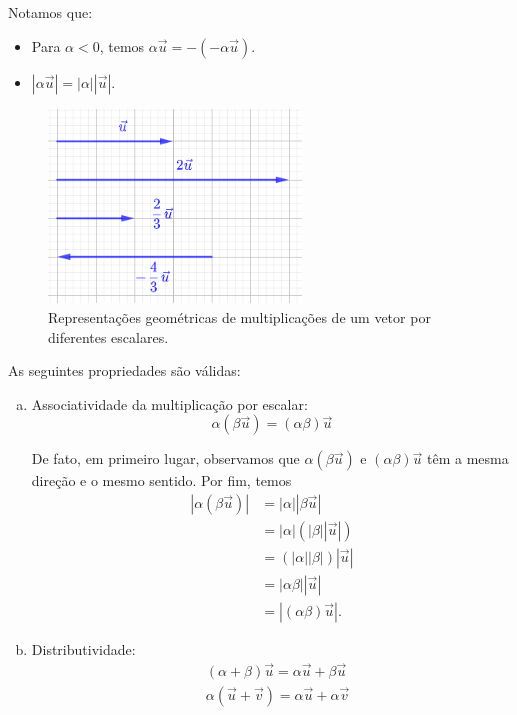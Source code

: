 \begin{obs}
  Notamos que:
  \begin{itemize}
  \item Para $\alpha<0$, temos $\alpha\vec{u} = -(-\alpha\vec{u})$.
  \item $|\alpha\vec{u}|=|\alpha||\vec{u}|$.
\end{itemize}
\end{obs}

\begin{figure}[H]
  \centering
  \includegraphics[width=0.6\textwidth]{./cap_vetor/dados/fig_vescalar/fig_vescalar}
  \caption{Representações geométricas de multiplicações de um vetor por diferentes escalares.}
  \label{fig:vescalar}
\end{figure}

\begin{obs}
  As seguintes propriedades são válidas:
  \begin{enumerate}[a)]
  \item Associatividade da multiplicação por escalar:
    \begin{equation}
      \alpha\left(\beta\vec{u}\right) = (\alpha\beta)\vec{u}
    \end{equation}

    De fato, em primeiro lugar, observamos que $\alpha\left(\beta\vec{u}\right)$ e $(\alpha\beta)\vec{u}$ têm a mesma direção e o mesmo sentido. Por fim, temos
    \begin{align}
      |\alpha\left(\beta\vec{u}\right)| &= |\alpha||\beta\vec{u}| \\
                                        &= |\alpha|\left(|\beta||\vec{u}|\right) \\
                                        &= \left(|\alpha||\beta|\right)|\vec{u}| \\
                                        &= |\alpha\beta||\vec{u}| \\
                                        &= |(\alpha\beta)\vec{u}|.
    \end{align}
    
  \item Distributividade:
    \begin{align}
      &(\alpha + \beta)\vec{u} = \alpha\vec{u} + \beta\vec{u}\\
      &\alpha\left(\vec{u}+\vec{v}\right) = \alpha\vec{u} + \alpha\vec{v}
    \end{align}
  \end{enumerate}
\end{obs}

